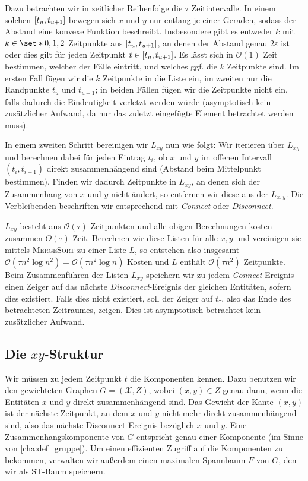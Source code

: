 Dazu betrachten wir in zeitlicher Reihenfolge die $\tau$ Zeitintervalle.
In einem solchen $\benbrace*{t_u,t_{u+1}}$ bewegen sich $x$ und $y$ nur entlang je einer Geraden, sodass der Abstand eine konvexe Funktion beschreibt.
Insbesondere gibt es entweder $k$ mit $k \in \set*{0,1,2}$ Zeitpunkte aus $\benbrace*{t_u,t_{u+1}}$, an denen der Abstand genau $2 \varepsilon$ ist oder dies gilt für jeden Zeitpunkt $t \in \benbrace*{t_u,t_{u+1}}$.
Es lässt sich in $\mathcal{O}(1)$ Zeit bestimmen, welcher der Fälle eintritt, und welches ggf. die $k$ Zeitpunkte sind.
Im ersten Fall fügen wir die $k$ Zeitpunkte in die Liste ein, im zweiten nur die Randpunkte $t_u$ und $t_{u+1}$; in beiden Fällen fügen wir die Zeitpunkte nicht ein, falls dadurch die Eindeutigkeit verletzt werden würde (asymptotisch kein zusätzlicher Aufwand, da nur das zuletzt eingefügte Element betrachtet werden muss).

In einem zweiten Schritt bereinigen wir $L_{xy}$ nun wie folgt: Wir iterieren über $L_{xy}$ und berechnen dabei für jeden Eintrag $t_i$, ob $x$ und $y$ im offenen Intervall $(t_i,t_{i+1})$ direkt zusammenhängend sind (Abstand beim Mittelpunkt bestimmen). 
Finden wir dadurch Zeitpunkte in $L_{xy}$, an denen sich der Zusammenhang von $x$ und $y$ nicht ändert, so entfernen wir diese aus der $L_{x,y}$.
Die Verbleibenden beschriften wir entsprechend mit \emph{Connect} oder \emph{Disconnect}.

$L_{xy}$ besteht aus $\mathcal{O}(\tau)$ Zeitpunkten und alle obigen Berechnungen kosten zusammen $\Theta(\tau)$ Zeit.
Berechnen wir diese Listen für alle $x,y$ und vereinigen sie mittels \textsc{MergeSort} zu einer Liste $L$, so entstehen also insgesamt $\mathcal{O}(\tau n^2 \log n^2) = \mathcal{O}(\tau n^2 \log n)$ Kosten und $L$ enthält $\mathcal{O}(\tau n^2)$ Zeitpunkte.
Beim Zusammenführen der Listen $L_{xy}$ speichern wir zu jedem \emph{Connect}-Ereignis einen Zeiger auf das nächste \emph{Disconnect}-Ereignis der gleichen Entitäten, sofern dies existiert.
Falls dies nicht existiert, soll der Zeiger auf $t_\tau$, also das Ende des betrachteten Zeitraumes, zeigen.
Dies ist asymptotisch betrachtet kein zusätzlicher Aufwand. 

\subsection{Die $xy$-Struktur} %
\label{sub:xy_struktur}
Wir müssen zu jedem Zeitpunkt $t$ die Komponenten kennen.
Dazu benutzen wir den gewichteten Graphen $G=(\mathcal{X},Z)$, wobei $(x,y) \in Z$ genau dann, wenn die Entitäten $x$ und $y$ direkt zusammenhängend sind.
Das Gewicht der Kante $(x,y)$ ist der nächste Zeitpunkt, an dem $x$ und $y$ nicht mehr direkt zusammenhängend sind, also das nächste Disconnect-Ereignis bezüglich $x$ und $y$.
Eine Zusammenhangskomponente von $G$ entspricht genau einer Komponente (im Sinne von \cref{cha:def_gruppe}).
Um einen effizienten Zugriff auf die Komponenten zu bekommen, verwalten wir außerdem einen maximalen Spannbaum $F$ von $G$, den wir als ST-Baum speichern.

